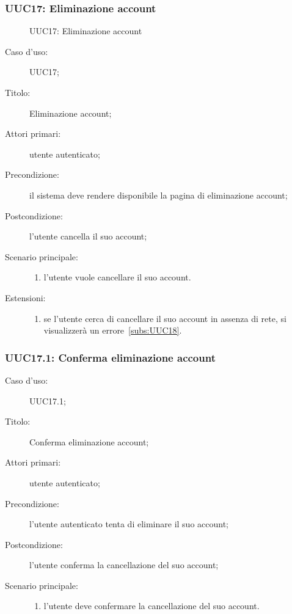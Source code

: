 \documentclass[../../../analisi-dei-requisiti.tex]{subfiles}
\begin{document}
\subsubsection{UUC17: Eliminazione account}%
\label{subs:UUC17}

\begin{figure}[H]
  \centering
  \caption{UUC17: Eliminazione account}%
  \label{fig:UUC17}
\end{figure}

\begin{description}
  \item[Caso d'uso:] UUC17;
  \item[Titolo:] Eliminazione account;
  \item[Attori primari:] utente autenticato;
  \item[Precondizione:] il sistema deve rendere disponibile la pagina di eliminazione account;
  \item[Postcondizione:] l'utente cancella il suo account;
  \item[Scenario principale:]
        \begin{enumerate}
          \item l'utente vuole cancellare il suo account.
        \end{enumerate}
  \item[Estensioni:]
        \begin{enumerate}
          \item se l'utente cerca di cancellare il suo account in assenza di rete, si visualizzerà un errore~\ref{subs:UUC18}.
        \end{enumerate}
\end{description}

\subsubsection{UUC17.1: Conferma eliminazione account}%
\label{subs:UUC17.1}

\begin{description}
  \item[Caso d'uso:] UUC17.1;
  \item[Titolo:] Conferma eliminazione account;
  \item[Attori primari:] utente autenticato;
  \item[Precondizione:] l'utente autenticato tenta di eliminare il suo account;
  \item[Postcondizione:] l'utente conferma la cancellazione del suo account;
  \item[Scenario principale:]
        \begin{enumerate}
          \item l'utente deve confermare la cancellazione del suo account.
        \end{enumerate}
\end{description}
\end{document}
